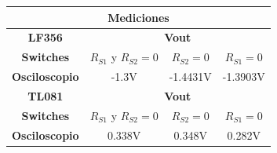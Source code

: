 \begin{table}[H]
\begin{center}
\begin{tabular}{|c|c|c|c|}
\hline
\multicolumn{4}{|c|}{\textbf{Mediciones}}                                        \\ \hline
\textbf{LF356}        & \multicolumn{3}{c|}{\textbf{Vout}}                       \\ \hline
\textbf{Switches}     & $R_{S1}$ y $ R_{S2} = 0$ & $ R_{S2} = 0$ & $ R_{S1} = 0$ \\ \hline
\textbf{Osciloscopio} & -1.3V                    & -1.4431V      & -1.3903V      \\ \hline
\textbf{TL081}        & \multicolumn{3}{c|}{\textbf{Vout}}                       \\ \hline
\textbf{Switches}     & $R_{S1}$ y $ R_{S2} = 0$ & $ R_{S2} = 0$ & $ R_{S1} = 0$ \\ \hline
\textbf{Osciloscopio} & 0.338V                   & 0.348V        & 0.282V        \\ \hline
\end{tabular}
\end{center}
\end{table}

